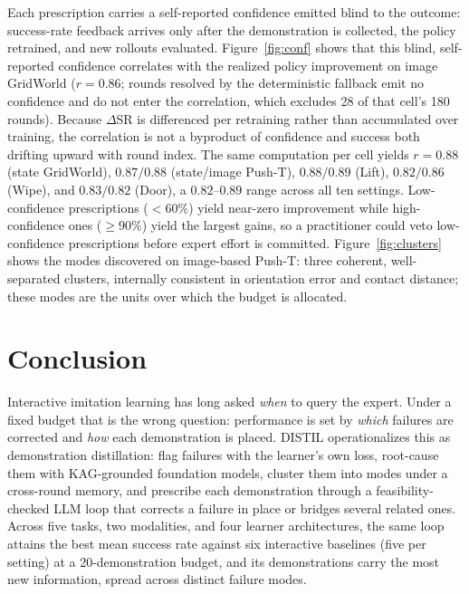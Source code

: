 \documentclass[letterpaper]{article} %
\begin{document}
Each prescription carries a self-reported confidence emitted blind to the
outcome: success-rate feedback arrives only after the demonstration is
collected, the policy retrained, and new rollouts evaluated. Figure~\ref{fig:conf} shows that this blind,
self-reported confidence correlates with the realized policy improvement on
image GridWorld ($r=0.86$; rounds resolved by the deterministic fallback
emit no confidence and do not enter the correlation, which excludes 28 of
that cell's 180 rounds). Because $\Delta$SR is differenced per retraining
rather than accumulated over training, the correlation is not a byproduct
of confidence and success both drifting upward with round index. The same
computation per cell yields $r=0.88$
(state GridWorld), $0.87/0.88$ (state/image Push-T), $0.88/0.89$ (Lift),
$0.82/0.86$ (Wipe), and $0.83/0.82$ (Door), a $0.82$--$0.89$ range across
all ten settings. Low-confidence
prescriptions ($<60\%$) yield near-zero improvement while high-confidence
ones ($\ge 90\%$) yield the largest gains, so a practitioner could veto
low-confidence prescriptions before expert effort is committed.
Figure~\ref{fig:clusters} shows the modes discovered on image-based Push-T:
three coherent, well-separated clusters, internally consistent in
orientation error and contact distance; these modes are the units over
which the budget is allocated.

\section{Conclusion}
\label{sec:conclusion}

Interactive imitation learning has long asked \emph{when} to query the
expert. Under a fixed budget that is the wrong question: performance is set
by \emph{which} failures are corrected and \emph{how} each demonstration is
placed. DISTIL operationalizes this as demonstration distillation: flag
failures with the learner's own loss, root-cause them with KAG-grounded
foundation models, cluster them into modes under a cross-round memory, and
prescribe each demonstration through a feasibility-checked LLM loop that
corrects a failure in place or bridges several related ones.
Across five tasks, two modalities, and four learner architectures, the
same loop attains the best mean success rate against six interactive
baselines (five per setting) at a 20-demonstration budget, and its
demonstrations carry the most new information, spread across distinct
failure modes.
\end{document}
